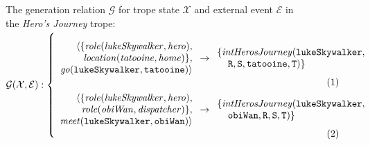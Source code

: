 \begin{figure}[!t]
\small
The generation relation $\mathcal{G}$ for trope state $\mathcal{X}$ and external event $\mathcal{E}$ in the \emph{Hero's Journey} trope:\\ 
$\mathcal{G(X, E)}:\left\{\mbox{%
\begin{minipage}[c]{0.85\textwidth}
\begin{align}
\begin{array}{r}
\langle \{\mathit{role(lukeSkywalker, hero)},\\
\mathit{location(tatooine, home)}\},\\
\mathit{go}\mathtt{(lukeSkywalker, tatooine)} \rangle
\end{array}
&\rightarrow
\begin{array}{l}
\{\mathit{intHerosJourney}\mathtt{(lukeSkywalker,}\\\;\;\;\;\mathtt{R, S, tatooine, T)}\}
\end{array}\label{eq:tatooine}\\
\begin{array}{r}
                                 \langle \{\mathit{role(lukeSkywalker, hero)},\\
  \mathit{role(obiWan, dispatcher)}\},\\
\mathit{meet}\mathtt{(lukeSkywalker, obiWan)} \rangle
\end{array}
&\rightarrow
\begin{array}{l}
\{\mathit{intHerosJourney}\mathtt{(lukeSkywalker,}\\\;\;\;\;\mathtt{obiWan, R, S, T)}\}
\end{array}\label{eq:hsnth}
\end{align}
\end{minipage}
}\right.$\smallskip


\end{figure}
